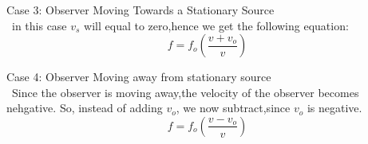 Case 3: Observer Moving Towards a Stationary Source\\\
in this case $v_s$ will equal to zero,hence we get the following equation:
\begin{equation}
    f=f_o(\frac{v+v_o}{v})
\end{equation} 

Case 4: Observer Moving away from stationary source\\\
Since the observer is moving away,the velocity of the observer becomes nehgative. So, instead of adding $v_o$, we now subtract,since $v_o$ is negative.
\begin{equation}
    f=f_o(\frac{v-v_o}{v})
\end{equation}
 
 

 

